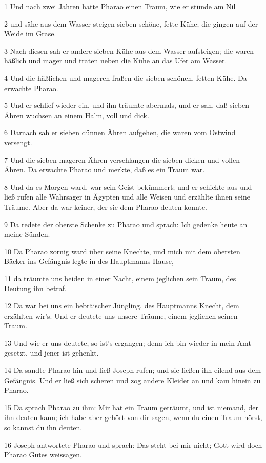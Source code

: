 \par 1 Und nach zwei Jahren hatte Pharao einen Traum, wie er stünde am Nil
\par 2 und sähe aus dem Wasser steigen sieben schöne, fette Kühe; die gingen auf der Weide im Grase.
\par 3 Nach diesen sah er andere sieben Kühe aus dem Wasser aufsteigen; die waren häßlich und mager und traten neben die Kühe an das Ufer am Wasser.
\par 4 Und die häßlichen und mageren fraßen die sieben schönen, fetten Kühe. Da erwachte Pharao.
\par 5 Und er schlief wieder ein, und ihn träumte abermals, und er sah, daß sieben Ähren wuchsen an einem Halm, voll und dick.
\par 6 Darnach sah er sieben dünnen Ähren aufgehen, die waren vom Ostwind versengt.
\par 7 Und die sieben mageren Ähren verschlangen die sieben dicken und vollen Ähren. Da erwachte Pharao und merkte, daß es ein Traum war.
\par 8 Und da es Morgen ward, war sein Geist bekümmert; und er schickte aus und ließ rufen alle Wahrsager in Ägypten und alle Weisen und erzählte ihnen seine Träume. Aber da war keiner, der sie dem Pharao deuten konnte.
\par 9 Da redete der oberste Schenke zu Pharao und sprach: Ich gedenke heute an meine Sünden.
\par 10 Da Pharao zornig ward über seine Knechte, und mich mit dem obersten Bäcker ins Gefängnis legte in des Hauptmanns Hause,
\par 11 da träumte uns beiden in einer Nacht, einem jeglichen sein Traum, des Deutung ihn betraf.
\par 12 Da war bei uns ein hebräischer Jüngling, des Hauptmanns Knecht, dem erzählten wir's. Und er deutete uns unsere Träume, einem jeglichen seinen Traum.
\par 13 Und wie er uns deutete, so ist's ergangen; denn ich bin wieder in mein Amt gesetzt, und jener ist gehenkt.
\par 14 Da sandte Pharao hin und ließ Joseph rufen; und sie ließen ihn eilend aus dem Gefängnis. Und er ließ sich scheren und zog andere Kleider an und kam hinein zu Pharao.
\par 15 Da sprach Pharao zu ihm: Mir hat ein Traum geträumt, und ist niemand, der ihn deuten kann; ich habe aber gehört von dir sagen, wenn du einen Traum hörst, so kannst du ihn deuten.
\par 16 Joseph antwortete Pharao und sprach: Das steht bei mir nicht; Gott wird doch Pharao Gutes weissagen.

